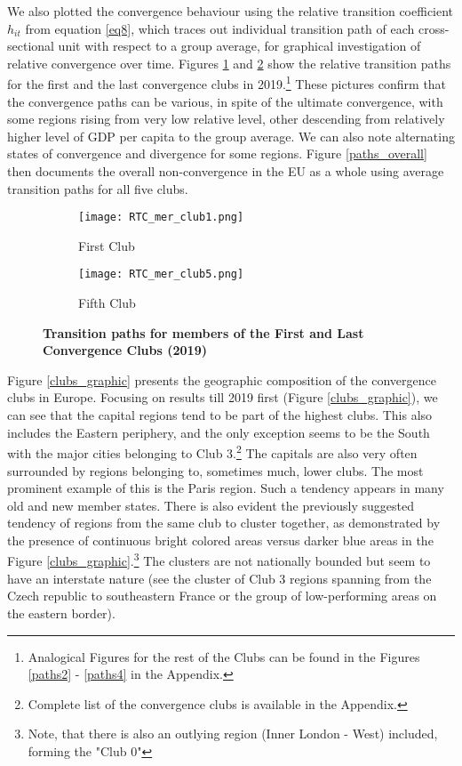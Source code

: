 \documentclass[11pt]{article}
\begin{document}
We also plotted the convergence behaviour using the relative transition coefficient $h_{it}$ from equation \ref{eq8}, which traces out individual transition path of each cross-sectional unit with respect to a group average, for graphical investigation of relative convergence over time. Figures \ref{paths1} and \ref{paths5} show the relative transition paths for the first and the last convergence clubs in 2019.\footnote{Analogical Figures for the rest of the Clubs can be found in the Figures \ref{paths2} - \ref{paths4} in the Appendix.} These pictures confirm that the convergence paths can be various, in spite of the ultimate convergence, with some regions rising from very low relative level, other descending from relatively higher level of GDP per capita to the group average. We can also note alternating states of convergence and divergence for some regions. Figure \ref{paths_overall} then documents the overall non-convergence in the EU as a whole using average transition paths for all five clubs.

\begin{figure}[!htbp]%
    \centering
\begin{subfigure}{0.45\textwidth}
    \centering
    \texttt{[image: RTC\_mer\_club1.png]}
    \caption{First Club}
    \label{paths1}   
\end{subfigure}\hfill
\begin{subfigure}{0.45\textwidth}
    \centering
    \texttt{[image: RTC\_mer\_club5.png]}
    \caption{Fifth Club}
    \label{paths5}
\end{subfigure}
\caption{\textbf{Transition paths for members of the First and Last Convergence Clubs (2019)}}
\label{convergence_paths}

\end{figure}


Figure \ref{clubs_graphic} presents the geographic composition of the convergence clubs in Europe. Focusing on results till 2019 first (Figure \ref{clubs_graphic}), we can see that the capital regions tend to be part of the highest clubs. This also includes the Eastern periphery, and the only exception seems to be the South with the major cities belonging to Club 3.\footnote{Complete list of the convergence clubs is available in the Appendix.} The capitals are also very often surrounded by regions belonging to, sometimes much, lower clubs. The most prominent example of this is the Paris region. Such a tendency appears in many old and new member states. There is also evident the previously suggested tendency of regions from the same club to cluster together, as demonstrated by the presence of continuous bright colored areas versus darker blue areas in the Figure \ref{clubs_graphic}.\footnote{Note, that there is also an outlying region (Inner London - West) included, forming the "Club 0"} The clusters are not nationally bounded but seem to have an interstate nature (see the cluster of Club 3 regions spanning from the Czech republic to southeastern France or the group of low-performing areas on the eastern border).
\end{document}
